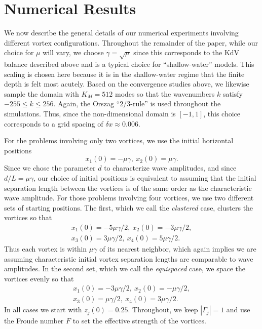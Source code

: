 \documentclass[a4paper,11pt]{article}
\begin{document}
\section{Numerical Results}

We now describe the general details of our numerical experiments involving different vortex configurations.  Throughout the remainder of the paper, while our choice for $\mu$ will vary, we choose $\gamma = \sqrt{\mu}$ since this corresponds to the KdV balance described above and is a typical choice for ``shallow-water'' models.  This scaling is chosen here because it is in the shallow-water regime that the finite depth is felt most acutely.  Based on the convergence studies above, we likewise sample the domain with $K_{M} = 512$ modes so that the wavenumbers $k$ satisfy $-255\leq k \leq 256$.  Again, the Orszag ``2/3-rule'' is used throughout the simulations.  Thus, since the non-dimensional domain is $[-1,1]$, this choice corresponds to a grid spacing of $\delta x \approx 0.006$.  

For the problems involving only two vortices, we use the initial horizontal positions
\begin{equation}
x_{1}(0)=-\mu\gamma, \ x_{2}(0)=\mu\gamma.
\label{initxpostv}
\end{equation}
Since we chose the parameter $d$ to characterize wave amplitudes, and since $d/L=\mu\gamma$, our choice of initial positions is equivalent to assuming that the initial  separation length between the vortices is of the same order as the characteristic wave amplitude.  For those problems involving four vortices, we use two different sets of starting positions.  The first, which we call the {\it clustered} case, clusters the vortices so that  
\begin{align*}
x_{1}(0)=-5\mu\gamma/2, ~ x_{2}(0)=-3\mu\gamma/2,\\ 
x_{3}(0)=3\mu\gamma/2,  ~ x_{4}(0)=5\mu\gamma/2.
\end{align*}
Thus each vortex is within $\mu\gamma$ of its nearest neighbor, which again implies we are assuming characteristic initial vortex separation lengths are comparable to wave amplitudes.  In the second set, which we call the {\it equispaced} case, we space the vortices evenly so that 
\begin{align*}
x_{1}(0)=-3\mu\gamma/2,  ~ x_{2}(0)=-\mu\gamma/2,\\ 
x_{3}(0)=\mu\gamma/2,   ~ x_{4}(0)=3\mu\gamma/2.
\end{align*}
In all cases we start with $z_{j}(0)=0.25$.  Throughout, we keep $|\Gamma_{j}|=1$ and use the Froude number $F$ to set the effective strength of the vortices.  
\end{document}
